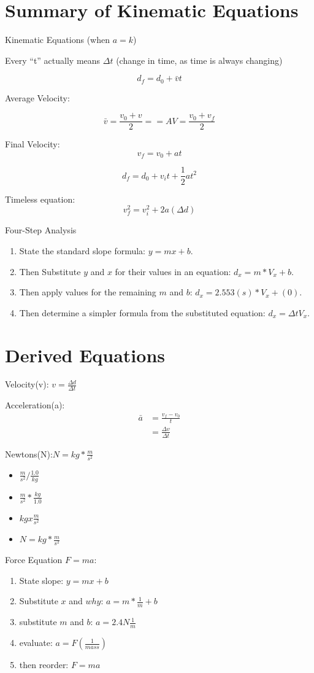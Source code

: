 \documentclass{article}
\begin{document}
\section{Summary of Kinematic Equations}

Kinematic Equations (when $a=k$)

Every ``t'' actually means $\Delta{t}$ (change in time, as time is always changing)

\[d_f = d_0 + \bar{v}t\]

Average Velocity:

\[\bar{v} = \frac{v_0 + v}{2} = = AV = \frac{v_0 + v_f}{2}\]

Final Velocity:
\[v_f = v_0 + at\]

\[d_f = d_0 + v_i t + \frac{1}{2} at^2\]

Timeless equation:
\begin{displaymath}
v_f^2 = v_i^2 + 2a(\Delta{d})
\end{displaymath}

Four-Step Analysis

\begin{enumerate}
\item State the standard slope formula: $y=mx+b$.
\item Then Substitute $y$ and $x$ for their values in an equation: $d_x = m*V_x + b$.
\item Then apply values for the remaining $m$ and $b$: $d_x = 2.553(s) * V_x + (0)$.
\item Then determine a simpler formula from the substituted equation: $d_x = \Delta{t}V_x$.
\end{enumerate}

\section{Derived Equations}

Velocity(v): $v = \frac{\Delta{d}}{\Delta{t}}$

Acceleration(a):
\begin{equation}
  \begin{split}
    \bar{a} & = \frac{v_f - v_0}{t} \\
              & = \frac{\Delta{v}}{\Delta{t}}
  \end{split}
  \end{equation}

Newtons(N):$N = kg * \frac{m}{s^2}$
\begin{itemize}
\item $\frac{m}{s^2} / \frac{1.0}{kg}$
\item $\frac{m}{s^2} * \frac{kg}{1.0}$
\item $kg x \frac{m}{s^2}$
\item $N = kg * \frac{m}{s^2}$
\end{itemize}

Force Equation $F=ma$:
\begin{enumerate}
\item State slope: $y=mx+b$
\item Substitute $x$ and $why$: $a=m*\frac{1}{m} + b$
\item substitute $m$ and $b$: $a=2.4N \frac{1}{m}$
\item evaluate: $a=F(\frac{1}{mass})$
\item then reorder: $F=ma$
  \end{enumerate}

  
  
\end{document}
